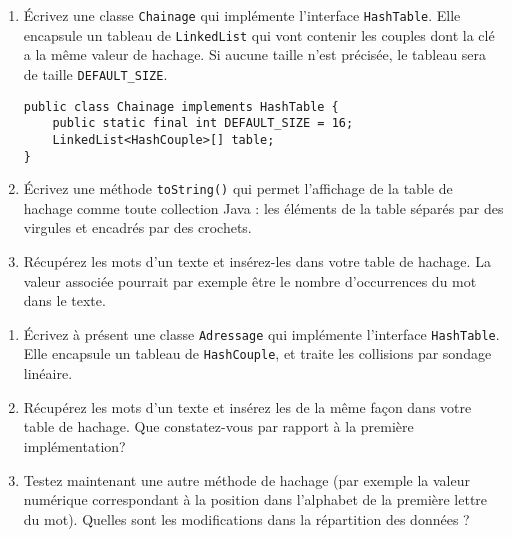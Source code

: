 \documentclass[iutinfo,a4paper,nocorrections,10pt]{ustl-tdtp}
\begin{document}
\begin{enumerate}

\item Écrivez une classe \texttt{Chainage} qui implémente l'interface \texttt{HashTable}. Elle encapsule un tableau de \texttt{LinkedList} qui vont contenir les couples dont la clé a la même valeur de hachage. Si aucune taille n'est précisée, le tableau sera de taille \texttt{DEFAULT\_SIZE}.

\begin{verbatim}
public class Chainage implements HashTable {
    public static final int DEFAULT_SIZE = 16;
    LinkedList<HashCouple>[] table;
}
\end{verbatim}

\item Écrivez une méthode \texttt{toString()} qui permet l'affichage de la table de hachage comme toute collection Java : les éléments de la table séparés par des virgules et encadrés par des crochets.

\item Récupérez les mots d'un texte et insérez-les dans votre table de hachage. La valeur associée pourrait par exemple être le nombre d'occurrences du mot dans le texte.

\end{enumerate}
\begin{enumerate}
\item Écrivez à présent une classe \texttt{Adressage} qui implémente l'interface \texttt{HashTable}. Elle encapsule un tableau de \texttt{HashCouple}, et traite les collisions par sondage linéaire.

\item Récupérez les mots d'un texte et insérez les de la même façon dans votre table de hachage. Que constatez-vous par rapport à la première implémentation?

\item Testez maintenant une autre méthode de hachage (par exemple la valeur numérique correspondant à la position dans l'alphabet de la première lettre du mot). Quelles sont les modifications dans la répartition des données ?
\end{enumerate}
\end{document}
